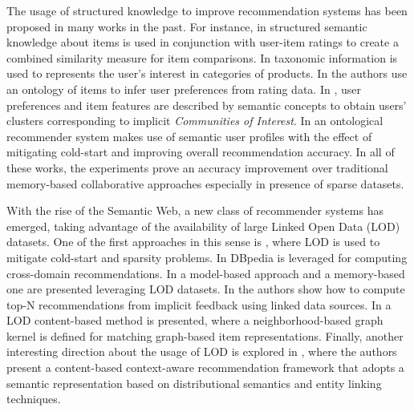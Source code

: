 The usage of structured knowledge to improve recommendation systems has been proposed in many works in the past. 
For instance, in \citep{mobasher2004} structured semantic knowledge about items is used in conjunction with user-item ratings to create a combined similarity measure for item comparisons. 
In \citep{Ziegler2004} taxonomic information is used to represents the user's interest in categories of products. %
In \citep{Anand2007} the authors use an ontology of items to infer user preferences from rating data. %
In \citep{Cantador08amultilayer}, user preferences and item features are described by semantic concepts to obtain users' clusters corresponding to implicit \textit{Communities of Interest}.
In \citep{Middleton_2009} an ontological recommender system makes use of semantic user profiles with the effect of mitigating cold-start and improving overall recommendation accuracy. 
In all of these works, the experiments prove an accuracy improvement over traditional memory-based collaborative approaches especially in presence of sparse datasets. 

With the rise of the Semantic Web, a new class of recommender systems has emerged, taking advantage of the availability of large Linked Open Data (LOD) datasets. 
One of the first approaches in this sense is \citep{HeitmannH10}, where LOD is used to mitigate cold-start and sparsity problems. 
In \citep{Fernandez-Tobias2011} DBpedia is leveraged for computing cross-domain recommendations. 
In \citep{DMOR12,DMORZ12} a model-based approach and a memory-based one are presented leveraging LOD datasets. 
In \citep{Ostuni2013} the authors show how to compute top-N recommendations from implicit feedback using linked data sources. 
In \citep{ODMD14a} a LOD content-based method is presented, where a neighborhood-based graph kernel is defined for matching graph-based item representations. 
Finally, another interesting direction about the usage of LOD is explored in \citep{MustoSLG14}, where the authors present a content-based context-aware recommendation framework that adopts a semantic representation based on distributional semantics and entity linking techniques.%

